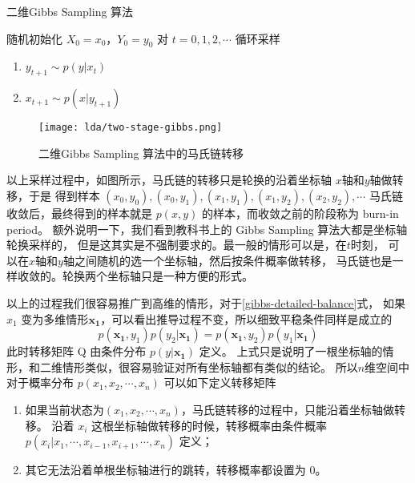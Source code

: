 \begin{algorithm}[htb]
\caption{二维Gibbs Sampling 算法}
\begin{algorithmic}[1]
\STATE 随机初始化 $X_0 = x_0，Y_0=y_0$
\STATE 对 $t=0,1,2,\cdots$ 循环采样
\begin{enumerate}
\item  $y_{t+1} \sim p(y|x_{t})$
\item  $x_{t+1} \sim p(x|y_{t+1})$
\end{enumerate}
\end{algorithmic}
\end{algorithm}
\begin{figure}[htbp]
\centering
\texttt{[image: lda/two-stage-gibbs.png]}
\caption{二维Gibbs Sampling 算法中的马氏链转移}
\end{figure}

以上采样过程中，如图所示，马氏链的转移只是轮换的沿着坐标轴 $x$轴和$y$轴做转移，于是
得到样本 $(x_0,y_0), (x_0,y_1), (x_1,y_1), (x_1,y_2),(x_2,y_2), \cdots $
马氏链收敛后，最终得到的样本就是 $p(x,y)$ 的样本，而收敛之前的阶段称为 burn-in period。
额外说明一下，我们看到教科书上的 Gibbs Sampling 算法大都是坐标轴轮换采样的，
但是这其实是不强制要求的。最一般的情形可以是，在$t$时刻，
可以在$x$轴和$y$轴之间随机的选一个坐标轴，然后按条件概率做转移，
马氏链也是一样收敛的。轮换两个坐标轴只是一种方便的形式。

以上的过程我们很容易推广到高维的情形，对于\eqref{gibbs-detailed-balance}式，
如果$x_1$ 变为多维情形$\mathbf{x_1}$，可以看出推导过程不变，所以细致平稳条件同样是成立的
\begin{equation}
\label{gibbs-detailed-balance-n-dimen}
p(\mathbf{x_1},y_1)p(y_2|\mathbf{x_1}) =  p(\mathbf{x_1},y_2)p(y_1|\mathbf{x_1})
\end{equation}
此时转移矩阵 Q 由条件分布 $p(y|\mathbf{x_1})$ 定义。
上式只是说明了一根坐标轴的情形，和二维情形类似，很容易验证对所有坐标轴都有类似的结论。
所以$n$维空间中对于概率分布 $p(x_1,x_2,\cdots, x_n)$ 可以如下定义转移矩阵

\begin{enumerate}
\item 如果当前状态为$(x_1,x_2,\cdots, x_n)$，马氏链转移的过程中，只能沿着坐标轴做转移。
沿着 $x_i$ 这根坐标轴做转移的时候，转移概率由条件概率
 $p(x_i|x_1, \cdots, x_{i-1}, x_{i+1}, \cdots, x_n)$ 定义；
\item 其它无法沿着单根坐标轴进行的跳转，转移概率都设置为 0。
\end{enumerate}

